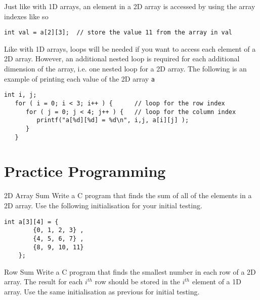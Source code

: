 \documentclass{pass}
\begin{document}
Just like with 1D arrays, an element in a 2D array is accessed by using the array indexes like so
\begin{lstlisting}[style=CStyle]
	int val = a[2][3];	// store the value 11 from the array in val
\end{lstlisting}

Like with 1D arrays, loops will be needed if you want to access each element of a 2D array. However, an additional nested loop is required for each additional dimension of the array, i.e. one nested loop for a 2D array. The following is an example of printing each value of the 2D array \texttt{a}
\begin{lstlisting}[style=CStyle]
   int i, j;
   for ( i = 0; i < 3; i++ ) {		// loop for the row index
      for ( j = 0; j < 4; j++ ) {	// loop for the column index
         printf("a[%d][%d] = %d\n", i,j, a[i][j] );
      }
   }
\end{lstlisting}

\pagebreak

\section*{Practice Programming}
\begin{task}{2D Array Sum}{}
Write a C program that finds the sum of all of the elements in a 2D array. Use the following initialisation for your initial testing.
\begin{lstlisting}[style=CStyle]
	int a[3][4] = {  
		{0, 1, 2, 3} ,
		{4, 5, 6, 7} ,   
		{8, 9, 10, 11}   
	};
\end{lstlisting}

\end{task}

\begin{task}{Row Sum}{}
Write a C program that finds the smallest number in each row of a 2D array. The result for each $i^{th}$ row should be stored in the $i^{th}$ element of a 1D array. Use the same initialisation as previous for initial testing.

\end{task}
\end{document}
